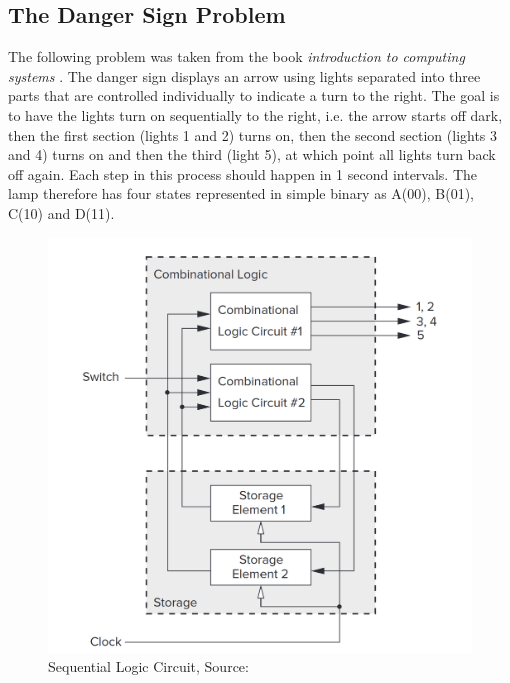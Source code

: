 \subsection{The Danger Sign Problem} \label{ssec:DangerSign}
The following problem was taken from the book \emph{introduction to computing systems} \cite[Chapter 3.6.6]{danger_sign}.
The danger sign displays an arrow using lights separated into three parts that are controlled individually to indicate a turn to the right. The goal is to have the lights turn on sequentially to the right, i.e. the arrow starts off dark, then the first section (lights 1 and 2) turns on, then the second section (lights 3 and 4) turns on and then the third (light 5), at which point all lights turn back off again. Each step in this process should happen in 1 second intervals. The lamp therefore has four states represented in simple binary as A(00), B(01), C(10) and D(11).
\begin{figure}[ht]
    \begin{center}\includegraphics[scale=0.6]{Figures/DangerSignLogicCircuit.png}\end{center}
    \caption[Sequential Logic Circuit]{Sequential Logic Circuit, Source: \cite[Chapter 3.6.6]{danger_sign}}
    \label{fig::DangerSignSequential}
\end{figure}
\newline
